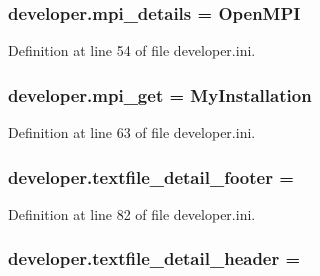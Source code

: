 \hypertarget{namespacedeveloper_a0d42d665be955c321eff953fda57debe}{
\subsubsection[{mpi\-\_\-details}]{\setlength{\rightskip}{0pt plus 5cm}developer.\-mpi\-\_\-details = Open\-M\-P\-I}}\label{namespacedeveloper_a0d42d665be955c321eff953fda57debe}


Definition at line 54 of file developer.\-ini.

\hypertarget{namespacedeveloper_ab22b1cccdd72c1ccebf6fb0b6b2c5b12}{
\subsubsection[{mpi\-\_\-get}]{\setlength{\rightskip}{0pt plus 5cm}developer.\-mpi\-\_\-get = My\-Installation}}\label{namespacedeveloper_ab22b1cccdd72c1ccebf6fb0b6b2c5b12}


Definition at line 63 of file developer.\-ini.

\hypertarget{namespacedeveloper_a99feae7126d21d7db9a97a595cbb3126}{
\subsubsection[{textfile\-\_\-detail\-\_\-footer}]{\setlength{\rightskip}{0pt plus 5cm}developer.\-textfile\-\_\-detail\-\_\-footer =}}\label{namespacedeveloper_a99feae7126d21d7db9a97a595cbb3126}


Definition at line 82 of file developer.\-ini.

\hypertarget{namespacedeveloper_ade719fb9c04af75a723b6d594610ccfc}{
\subsubsection[{textfile\-\_\-detail\-\_\-header}]{\setlength{\rightskip}{0pt plus 5cm}developer.\-textfile\-\_\-detail\-\_\-header =}}\label{namespacedeveloper_ade719fb9c04af75a723b6d594610ccfc}


